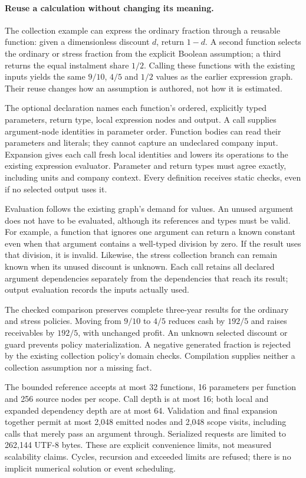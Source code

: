 \paragraph{Reuse a calculation without changing its meaning.}
The collection example can express the ordinary fraction through a reusable
function: given a dimensionless discount \(d\), return \(1-d\). A second
function selects the ordinary or stress fraction from the explicit Boolean
assumption; a third returns the equal instalment share \(1/2\). Calling
these functions with the existing inputs yields the same \(9/10\), \(4/5\)
and \(1/2\) values as the earlier expression graph. Their reuse changes
how an assumption is authored, not how it is estimated.

The optional  declaration names each function's
ordered, explicitly typed parameters, return type, local expression nodes
and output. A call supplies argument-node identities in parameter order.
Function bodies can read their parameters and literals; they cannot capture
an undeclared company input. Expansion gives each call fresh local identities
and lowers its operations to the existing expression evaluator. Parameter
and return types must agree exactly, including units and company context.
Every definition receives static checks, even if no selected output uses it.

Evaluation follows the existing graph's demand for values. An unused argument
does not have to be evaluated, although its references and types must be valid.
For example, a function that ignores one argument can return a known constant
even when that argument contains a well-typed division by zero. If the result
uses that division, it is invalid. Likewise, the stress collection branch can
remain known when its unused discount is unknown. Each call retains all
declared argument dependencies separately from the dependencies that reach its
result; output evaluation records the inputs actually used.

The checked comparison preserves complete three-year results for the ordinary
and stress policies. Moving from \(9/10\) to \(4/5\) reduces cash by
\(192/5\) and raises receivables by \(192/5\), with unchanged profit.
An unknown selected discount or guard prevents policy materialization. A
negative generated fraction is rejected by the existing collection policy's
domain checks. Compilation supplies neither a collection assumption nor a
missing fact.

The bounded reference accepts at most 32 functions, 16 parameters per
function and 256 source nodes per scope. Call depth is at most 16; both
local and expanded dependency depth are at most 64. Validation and final
expansion together permit at most 2,048 emitted nodes and 2,048 scope visits,
including calls that merely pass an argument through. Serialized requests
are limited to 262,144 UTF-8 bytes. These are explicit convenience limits,
not measured scalability claims. Cycles, recursion and exceeded limits are
refused; there is no implicit numerical solution or event scheduling.

